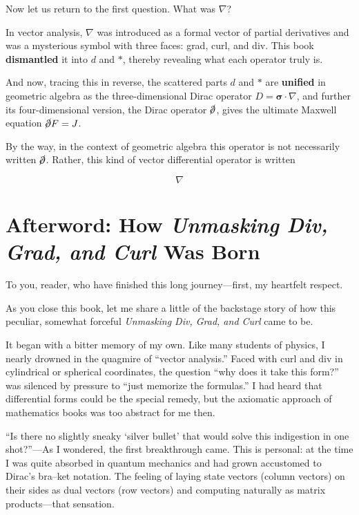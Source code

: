 Now let us return to the first question. What was \(\nabla\)?

In vector analysis, \(\nabla\) was introduced as a formal vector of
partial derivatives and was a mysterious symbol with three faces: grad,
curl, and div. This book \textbf{dismantled} it into \(d\) and \(\ast\),
thereby revealing what each operator truly is.

And now, tracing this in reverse, the scattered parts \(d\) and \(\ast\)
are \textbf{unified} in geometric algebra as the three-dimensional Dirac
operator \(D = \bm{\sigma}\!\cdot\!\nabla\), and further its
four-dimensional version, the Dirac operator \(\cancel{\partial}\),
gives the ultimate Maxwell equation \(\cancel{\partial} F = J\).

By the way, in the context of geometric algebra this operator is not
necessarily written \(\cancel{\partial}\). Rather, this kind of vector
differential operator is written

\[
\nabla
\]

\newpage

\hypertarget{afterword-how-unmasking-div-grad-and-curl-was-born}{%
\chapter{\texorpdfstring{Afterword: How \emph{Unmasking Div, Grad, and
Curl} Was
Born}{Afterword: How Unmasking Div, Grad, and Curl Was Born}}\label{afterword-how-unmasking-div-grad-and-curl-was-born}}

To you, reader, who have finished this long journey---first, my
heartfelt respect.

As you close this book, let me share a little of the backstage story of
how this peculiar, somewhat forceful \emph{Unmasking Div, Grad, and
Curl} came to be.

It began with a bitter memory of my own. Like many students of physics,
I nearly drowned in the quagmire of ``vector analysis.'' Faced with
\(\mathrm{curl}\) and \(\mathrm{div}\) in cylindrical or spherical
coordinates, the question ``why does it take this form?'' was silenced
by pressure to ``just memorize the formulas.'' I had heard that
differential forms could be the special remedy, but the axiomatic
approach of mathematics books was too abstract for me then.

``Is there no slightly sneaky `silver bullet' that would solve this
indigestion in one shot?''---As I wondered, the first breakthrough came.
This is personal: at the time I was quite absorbed in quantum mechanics
and had grown accustomed to Dirac's bra--ket notation. The feeling of
laying state vectors (column vectors) on their sides as dual vectors
(row vectors) and computing naturally as matrix products---that
sensation.

